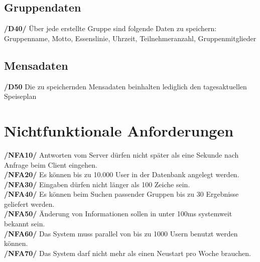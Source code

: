 \documentclass[a4paper]{scrreprt}
\begin{document}
\section{Gruppendaten}

\begin{addmargin}[25pt]{0pt}
\textbf{/D40/} Über jede erstellte Gruppe sind folgende Daten zu speichern:\\
Gruppenname, Motto, Essenslinie, Uhrzeit, Teilnehmeranzahl, Gruppenmitglieder\\
\end{addmargin}

\section{Mensadaten}

\begin{addmargin}[25pt]{0pt}
\textbf{/D50} Die zu speichernden Mensadaten beinhalten lediglich den tagesaktuellen Speiseplan\\
\end{addmargin}



\chapter{Nichtfunktionale Anforderungen}

\begin{addmargin}[25pt]{0pt} 
\textbf{/NFA10/} Antworten vom Server dürfen nicht später als eine Sekunde nach Anfrage beim Client eingehen.\\
\textbf{/NFA20/} Es können bis zu 10.000 User in der Datenbank angelegt werden.\\
\textbf{/NFA30/} Eingaben dürfen nicht länger als 100 Zeiche sein.\\
\textbf{/NFA40/} Es können beim Suchen passender Gruppen bis zu 30 Ergebnisse geliefert werden.\\
\textbf{/NFA50/} Änderung von Informationen sollen in unter 100ms systemweit bekannt sein.\\
\textbf{/NFA60/} Das System muss parallel von bis zu 1000 Usern benutzt werden können.\\
\textbf{/NFA70/} Das System darf nicht mehr als einen Neustart pro Woche brauchen.\\
\end{addmargin}
\end{document}
